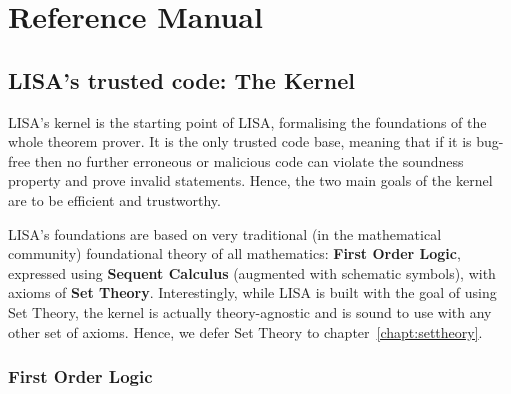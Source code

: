 \newcommand\Var{\operatorname{Var}}
\newcommand\FormulaVar{\operatorname{FormulaVar}}
\newcommand\List{\operatorname{List}}
\newcommand\Lambdaa{\operatorname{Lambda}}
\newcommand\LambdaTT{\operatorname{LambdaTermTerm}}
\newcommand\LambdaTF{\operatorname{LambdaTermFormula}}
\newcommand\LambdaFF{\operatorname{LambdaFormulaFormula}}







\part{Reference Manual}
\label{part:manual}
\chapter{LISA's trusted code: The Kernel}
\label{chapt:kernel}
LISA's kernel is the starting point of LISA, formalising the foundations of the whole theorem prover. It is the only trusted code base, meaning that if it is bug-free then no further erroneous or malicious code can violate the soundness property and prove invalid statements. Hence, the two main goals of the kernel are to be efficient and trustworthy.

LISA's foundations are based on very traditional (in the mathematical community) foundational theory of all mathematics: \textbf{First Order Logic}, expressed using \textbf{Sequent Calculus} (augmented with schematic symbols), with axioms of \textbf{Set Theory}.
Interestingly, while LISA is built with the goal of using Set Theory, the kernel is actually theory-agnostic and is sound to use with any other set of axioms. Hence, we defer Set Theory to chapter~\ref{chapt:settheory}.

\section{First Order Logic}
\label{sect:FOL}
